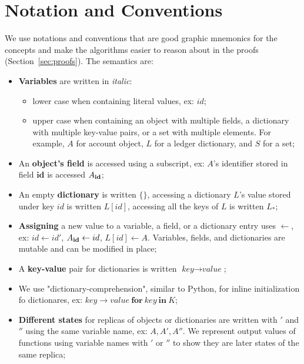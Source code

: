 \documentclass[9pt, oneside]{article}   	%
\begin{document}
\newpage




\section{Notation and Conventions}
\label{apdx:notation}

We use notations and conventions that are good graphic mnemonics for the concepts and make the algorithms easier to reason about in the proofs (Section~\ref{sec:proofs}). The semantics are:

\begin{itemize}
	\item \textbf{Variables} are written in \textit{italic}:
		\begin{itemize}
			\item  lower case when containing literal values, ex: $id$;
			\item upper case when containing an object with multiple fields, a dictionary with multiple key-value pairs, or a set with multiple elements. For example, $A$ for account object, $L$ for a ledger dictionary, and $S$ for a set;
		\end{itemize}
	\item An \textbf{object's field} is accessed using a subscript, ex: $A$'s identifier stored in field $\textbf{id}$ is accessed $A_{\scriptsize \textbf{id}}$;
	\item An empty \textbf{dictionary} is written $\{\}$, accessing a dictionary $L$'s value stored under key $id$ is written $L[id]$, accessing all the keys of $L$ is written $L_*$;
	\item \textbf{Assigning} a new value to a variable, a field, or a dictionary entry uses $\leftarrow$, ex: $id \leftarrow id'$, $A_{\scriptsize\textbf{id}} \leftarrow id$, $L[id] \leftarrow A$. Variables, fields, and dictionaries are mutable and can be modified in place;
	 \item A \textbf{key-value} pair for dictionaries is written $\textit{key} \rightarrow \textit{value}$;
	 \item We use "dictionary-comprehension", similar to Python, for inline initialization fo dictionares, ex: ${ \textit{key} \rightarrow \textit{value} ~\textbf{for}~ \textit{key} ~\textbf{in}~ K }$;
	\item \textbf{Different states} for replicas of objects or dictionaries are written with $'$ and $''$ using the same variable name, ex: $A, A', A''$. We represent output values of functions using variable names with $'$ or $''$ to show they are later states of the same replica;

\end{itemize}
\end{document}
